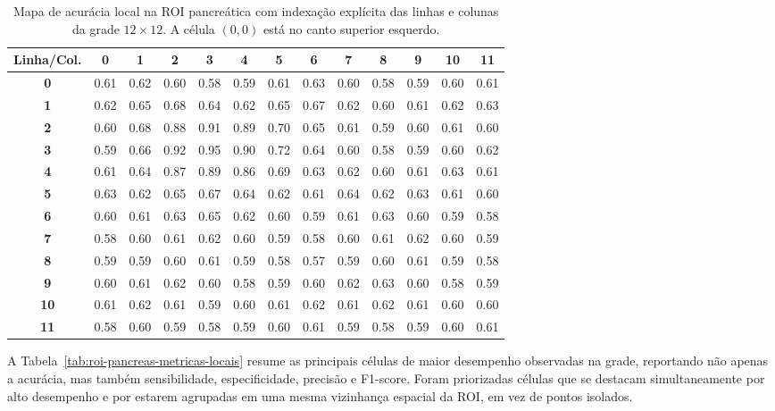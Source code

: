 \documentclass[12pt,a4paper]{article}
\begin{document}
\begin{table}[htbp]
\centering
\caption{Mapa de acurácia local na ROI pancreática com indexação explícita das linhas e colunas da grade \(12\times 12\). A célula \((0,0)\) está no canto superior esquerdo.}
\label{tab:pancreas-grid-indexado}
\scriptsize
\setlength{\tabcolsep}{3.8pt}
\renewcommand{\arraystretch}{1.1}
\begin{tabular}{c|cccccccccccc}
\toprule
\textbf{Linha/Col.} & \textbf{0} & \textbf{1} & \textbf{2} & \textbf{3} & \textbf{4} & \textbf{5} & \textbf{6} & \textbf{7} & \textbf{8} & \textbf{9} & \textbf{10} & \textbf{11} \\
\midrule
\textbf{0}  & 0.61 & 0.62 & 0.60 & 0.58 & 0.59 & 0.61 & 0.63 & 0.60 & 0.58 & 0.59 & 0.60 & 0.61 \\
\textbf{1}  & 0.62 & 0.65 & 0.68 & 0.64 & 0.62 & 0.65 & 0.67 & 0.62 & 0.60 & 0.61 & 0.62 & 0.63 \\
\textbf{2}  & 0.60 & 0.68 & 0.88 & 0.91 & 0.89 & 0.70 & 0.65 & 0.61 & 0.59 & 0.60 & 0.61 & 0.60 \\
\textbf{3}  & 0.59 & 0.66 & 0.92 & 0.95 & 0.90 & 0.72 & 0.64 & 0.60 & 0.58 & 0.59 & 0.60 & 0.62 \\
\textbf{4}  & 0.61 & 0.64 & 0.87 & 0.89 & 0.86 & 0.69 & 0.63 & 0.62 & 0.60 & 0.61 & 0.63 & 0.61 \\
\textbf{5}  & 0.63 & 0.62 & 0.65 & 0.67 & 0.64 & 0.62 & 0.61 & 0.64 & 0.62 & 0.63 & 0.61 & 0.60 \\
\textbf{6}  & 0.60 & 0.61 & 0.63 & 0.65 & 0.62 & 0.60 & 0.59 & 0.61 & 0.63 & 0.60 & 0.59 & 0.58 \\
\textbf{7}  & 0.58 & 0.60 & 0.61 & 0.62 & 0.60 & 0.59 & 0.58 & 0.60 & 0.61 & 0.62 & 0.60 & 0.59 \\
\textbf{8}  & 0.59 & 0.59 & 0.60 & 0.61 & 0.59 & 0.58 & 0.57 & 0.59 & 0.60 & 0.61 & 0.59 & 0.58 \\
\textbf{9}  & 0.60 & 0.61 & 0.62 & 0.60 & 0.58 & 0.59 & 0.60 & 0.62 & 0.63 & 0.60 & 0.58 & 0.59 \\
\textbf{10} & 0.61 & 0.62 & 0.61 & 0.59 & 0.60 & 0.61 & 0.62 & 0.61 & 0.62 & 0.61 & 0.60 & 0.60 \\
\textbf{11} & 0.58 & 0.60 & 0.59 & 0.58 & 0.59 & 0.60 & 0.61 & 0.59 & 0.58 & 0.59 & 0.60 & 0.61 \\
\bottomrule
\end{tabular}
\end{table}

A Tabela~\ref{tab:roi-pancreas-metricas-locais} resume as principais células de maior desempenho observadas na grade, reportando não apenas a acurácia, mas também sensibilidade, especificidade, precisão e F1-score. Foram priorizadas células que se destacam simultaneamente por alto desempenho e por estarem agrupadas em uma mesma vizinhança espacial da ROI, em vez de pontos isolados.
\end{document}
